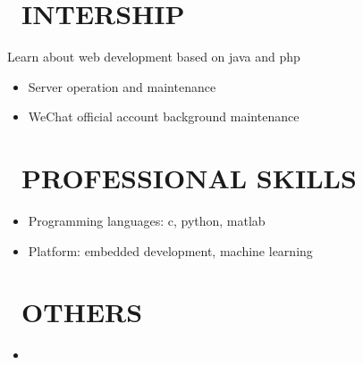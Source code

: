 \documentclass{resume}
\begin{document}
\section{\faFile\ INTERSHIP}
Learn about web development based on java and php
\begin{itemize}
  \item Server operation and maintenance
  \item WeChat official account background maintenance
\end{itemize}
 

\section{\faCogs\ PROFESSIONAL SKILLS}
\begin{itemize}[parsep=0.5ex]
  \item Programming languages: c, python, matlab
  \item Platform: embedded development, machine learning
\end{itemize}


\section{\faFlickr\ OTHERS}
 
    \begin{itemize}
      \item {}
    \end{itemize}
     
\end{document}
